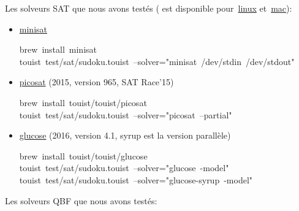 \noindent Les solveurs SAT que nous avons testés ( est disponible pour~\href{http://linuxbrew.sh}{linux} et~\href{https://brew.sh}{mac}):%

\begin{itemize}%

\item{}
\href{http://minisat.se}{minisat}%
\begin{footnotesize}
\begin{mdpre}%
\noindent brew~install~minisat\\
touist~test/sat/sudoku.touist~--solver="minisat~/dev/stdin~/dev/stdout"%
\end{mdpre}%
\end{footnotesize}

\item{}
\href{http://fmv.jku.at/picosat}{picosat} (2015, version 965, SAT Race'15)%
\begin{footnotesize}
\begin{mdpre}%
\noindent brew~install~touist/touist/picosat\\
touist~test/sat/sudoku.touist~--solver="picosat~--partial"%
\end{mdpre}%
\end{footnotesize}

\item{}
\href{https://www.labri.fr/perso/lsimon/glucose}{glucose} (2016, version 4.1, syrup est la version parallèle)%
\begin{footnotesize}
\begin{mdpre}%
\noindent brew~install~touist/touist/glucose\\
touist~test/sat/sudoku.touist~--solver="glucose~-model"\\
touist~test/sat/sudoku.touist~--solver="glucose-syrup~-model"%
\end{mdpre}%
\end{footnotesize}%
\end{itemize}%

\noindent Les solveurs QBF que nous avons testés:%

